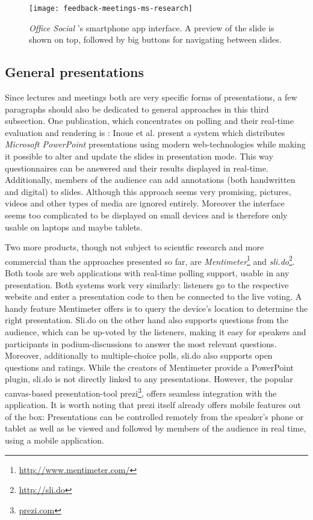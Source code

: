 \begin{figure}
\centering
\texttt{[image: feedback-meetings-ms-research]}
\caption{\emph{Office Social} \cite{Chattopadhyay:OfficeSocialRemoteControl}'s smartphone app interface. A preview of the slide is shown on top, followed by big buttons for navigating between slides.}
\label{fig:related-work-crowd-feedback}
\end{figure}

\subsection{General presentations}
Since lectures and meetings both are very specific forms of presentations, a few paragraphs should also be dedicated to general approaches in this third subsection.
One publication, which concentrates on polling and their real-time evaluation and rendering is \cite{Inoue:RealTimeQuestionnaire}: Inoue et al. present a system which distributes \emph{Microsoft PowerPoint} presentations using modern web-technologies while making it possible to alter and update the slides in presentation mode. This way questionnaires can be answered and their results displayed in real-time. Additionally, members of the audience can add annotations (both handwritten and digital) to slides. Although this approach seems very promising, pictures, videos and other types of media are ignored entirely. Moreover the interface seems too complicated to be displayed on small devices and is therefore only usable on laptops and maybe tablets.

Two more products, though not subject to scientfic research and more commercial than the approaches presented so far, are \emph{Mentimeter}\footnote{\url{http://www.mentimeter.com/}} and \emph{sli.do}\footnote{\url{http://sli.do}}. Both tools are web applications with real-time polling support, usable in any presentation. Both systems work very similarly: listeners go to the respective website and enter a presentation code to then be connected to the live voting. A handy feature Mentimeter offers is to query the device's location to determine the right presentation. Sli.do on the other hand also supports questions from the audience, which can be up-voted by the listeners, making it easy for speakers and participants in podium-discussions to answer the most relevant questions. Moreover, additionally to multiple-choice polls, sli.do also supports open questions and ratings. While the creators of Mentimeter provide a PowerPoint plugin, sli.do is not directly linked to any presentations. However, the popular canvas-based presentation-tool prezi\footnote{\url{prezi.com}}, offers seamless integration with the application. It is worth noting that prezi itself already offers mobile features out of the box: Presentations can be controlled remotely from the speaker's phone or tablet as well as be viewed and followed by members of the audience in real time, using a mobile application.

